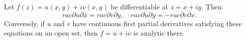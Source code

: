 Let $f(z) = u(x,y) + iv(x,y)$ be differentiable at $z = x+iy$. Then:
$$rac{\partial u}{\partial x} = rac{\partial v}{\partial y}, \quad rac{\partial u}{\partial y} = -rac{\partial v}{\partial x}.$$
Conversely, if $u$ and $v$ have continuous first partial derivatives satisfying these equations on an open set, then $f = u+iv$ is analytic there.
